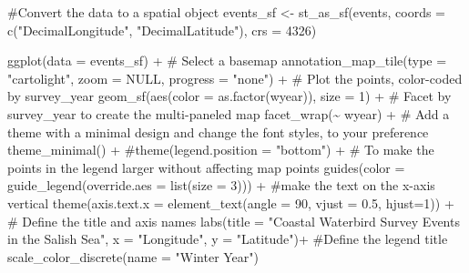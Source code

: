 \documentclass[
  letterpaper,
  DIV=11,
  numbers=noendperiod]{scrreprt}
\newenvironment{Shaded}{\begin{snugshade}}{\end{snugshade}}
\newcommand{\AttributeTok}[1]{\textcolor[rgb]{0.40,0.45,0.13}{#1}}
\newcommand{\CommentTok}[1]{\textcolor[rgb]{0.37,0.37,0.37}{#1}}
\newcommand{\ConstantTok}[1]{\textcolor[rgb]{0.56,0.35,0.01}{#1}}
\newcommand{\DecValTok}[1]{\textcolor[rgb]{0.68,0.00,0.00}{#1}}
\newcommand{\FloatTok}[1]{\textcolor[rgb]{0.68,0.00,0.00}{#1}}
\newcommand{\FunctionTok}[1]{\textcolor[rgb]{0.28,0.35,0.67}{#1}}
\newcommand{\NormalTok}[1]{\textcolor[rgb]{0.00,0.23,0.31}{#1}}
\newcommand{\OtherTok}[1]{\textcolor[rgb]{0.00,0.23,0.31}{#1}}
\newcommand{\SpecialCharTok}[1]{\textcolor[rgb]{0.37,0.37,0.37}{#1}}
\newcommand{\StringTok}[1]{\textcolor[rgb]{0.13,0.47,0.30}{#1}}
\begin{document}
\begin{Shaded}
\begin{Highlighting}[]
\CommentTok{\#Convert the data to a spatial object}
\NormalTok{events\_sf }\OtherTok{\textless{}{-}} \FunctionTok{st\_as\_sf}\NormalTok{(events, }\AttributeTok{coords =} \FunctionTok{c}\NormalTok{(}\StringTok{"DecimalLongitude"}\NormalTok{, }\StringTok{"DecimalLatitude"}\NormalTok{), }\AttributeTok{crs =} \DecValTok{4326}\NormalTok{)}

\FunctionTok{ggplot}\NormalTok{(}\AttributeTok{data =}\NormalTok{ events\_sf) }\SpecialCharTok{+}
  \CommentTok{\# Select a basemap}
  \FunctionTok{annotation\_map\_tile}\NormalTok{(}\AttributeTok{type =} \StringTok{"cartolight"}\NormalTok{, }\AttributeTok{zoom =} \ConstantTok{NULL}\NormalTok{, }\AttributeTok{progress =} \StringTok{"none"}\NormalTok{) }\SpecialCharTok{+}
  \CommentTok{\# Plot the points, color{-}coded by survey\_year}
  \FunctionTok{geom\_sf}\NormalTok{(}\FunctionTok{aes}\NormalTok{(}\AttributeTok{color =} \FunctionTok{as.factor}\NormalTok{(wyear)), }\AttributeTok{size =} \DecValTok{1}\NormalTok{) }\SpecialCharTok{+}
  \CommentTok{\# Facet by survey\_year to create the multi{-}paneled map}
  \FunctionTok{facet\_wrap}\NormalTok{(}\SpecialCharTok{\textasciitilde{}}\NormalTok{ wyear) }\SpecialCharTok{+}
  \CommentTok{\# Add a theme with a minimal design and change the font styles, to your preference}
  \FunctionTok{theme\_minimal}\NormalTok{() }\SpecialCharTok{+}
  \CommentTok{\#theme(legend.position = "bottom") +}
  \CommentTok{\# To make the points in the legend larger without affecting map points}
  \FunctionTok{guides}\NormalTok{(}\AttributeTok{color =} \FunctionTok{guide\_legend}\NormalTok{(}\AttributeTok{override.aes =} \FunctionTok{list}\NormalTok{(}\AttributeTok{size =} \DecValTok{3}\NormalTok{))) }\SpecialCharTok{+}
  \CommentTok{\#make the text on the x{-}axis vertical}
  \FunctionTok{theme}\NormalTok{(}\AttributeTok{axis.text.x =} \FunctionTok{element\_text}\NormalTok{(}\AttributeTok{angle =} \DecValTok{90}\NormalTok{, }\AttributeTok{vjust =} \FloatTok{0.5}\NormalTok{, }\AttributeTok{hjust=}\DecValTok{1}\NormalTok{)) }\SpecialCharTok{+}
  \CommentTok{\# Define the title and axis names}
  \FunctionTok{labs}\NormalTok{(}\AttributeTok{title =} \StringTok{"Coastal Waterbird Survey Events in the Salish Sea"}\NormalTok{,}
       \AttributeTok{x =} \StringTok{"Longitude"}\NormalTok{,}
       \AttributeTok{y =} \StringTok{"Latitude"}\NormalTok{)}\SpecialCharTok{+}
  \CommentTok{\#Define the legend title}
  \FunctionTok{scale\_color\_discrete}\NormalTok{(}\AttributeTok{name =} \StringTok{"Winter Year"}\NormalTok{)}
\end{Highlighting}
\end{Shaded}
\end{document}
